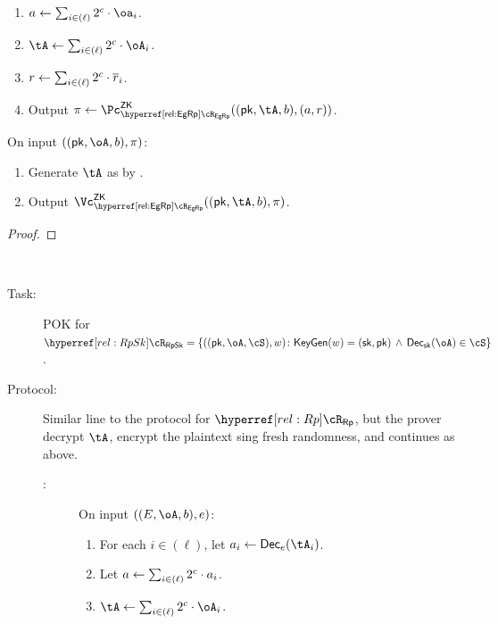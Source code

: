 \begin{description}
\begin{description}
\begin{description}
	\begin{enumerate}
			\item   $a \asn  \sum_{i\in (\ell)}   2^\cs \cdot \oa_i$. 
		\item    $\tA \asn  \sum_{i\in (\ell)}    2^\cs \cdot \oA_i$. 
		\item    $r \leftarrow  \sum_{i\in (\ell)}  2^c \cdot \overline{r}_i$. 
        
        \item  Output $\pi \asn \pZK{\rEgRp}((\pk,\tA,b), (a,r))$.
        
	\end{enumerate}
	
	
\item[\Vc:] On input $((\pk,\oA,b),\pi)$:
	
	\begin{enumerate}
		\item   Generate $\tA$ as by \Pc.
		\item  Output $\vZK{\rEgRp}((\pk,\tA,b), \pi)$.
		
	\end{enumerate}
	
\end{description}
\end{description}

		\begin{proof}
		\end{proof}
\item[In-range proof using sceret key.]~  

\begin{description}
	\item[Task:] POK for $\rRpSk =\rRpSkDef$.
	
	
	\item[Protocol:] Similar line to the protocol for $\rRp$, but  the prover  decrypt $\tA$, encrypt the plaintext sing  fresh randomness, and continues as above.
	
	
	\begin{description}
		\item[\Pc:] On input $((E,\oA,b),e)$:
		
		\begin{enumerate}
		
		
			\item   For each $i\in  (\ell)$, let $a_i \asn  \Dec_e(\tA_i)$.
			
			
			\item  Let  $a\leftarrow  \sum_{i\in (\ell)}    2^c \cdot a_i$. 
			
			\item    $\tA \asn  \sum_{i\in (\ell)}    2^\cs \cdot \oA_i$. 
			

\end{enumerate}
\end{description}
\end{description}
\end{description}

